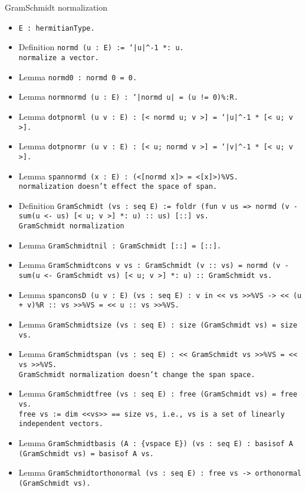 \noindent GramSchmidt normalization
\begin{itemize}
\item \tt{E : hermitianType}.
\item Definition \tt{normd (u : E) := `|u|\^{}-1 *: u.} \\
	normalize a vector.
\item Lemma \tt{normd0 : normd 0 = 0.}
\item Lemma \tt{norm\us normd (u : E) : `|normd u| = (u != 0)\%:R.}
\item Lemma \tt{dotp\us norml (u v : E) :
  [< normd u; v >] = `|u|\^{}-1 * [< u; v >].}
\item Lemma \tt{dotp\us normr (u v : E) :
  [< u; normd v >] = `|v|\^{}-1 * [< u; v >].}
\item Lemma \tt{span\us normd (x : E) : (<[normd x]> = <[x]>)\%VS.} \\
	normalization doesn't effect the space of span.
\item Definition \tt{GramSchmidt (vs : seq E) :=
  foldr (fun v us => normd (v - \bs sum\us (u <- us) [< u; v >] *: u) :: us) [::] vs.} \\
  GramSchmidt normalization
\item Lemma \tt{GramSchmidt\us nil : GramSchmidt [::] = [::].}
\item Lemma \tt{GramSchmidt\us cons v vs : GramSchmidt (v :: vs) =
  normd (v - \bs sum\us (u <- GramSchmidt vs) [< u; v >] *: u) :: GramSchmidt vs.}
\item Lemma \tt{span\us consD (u v : E) (vs : seq E) :
  v \bs in << vs >>\%VS -> << (u + v)\%R :: vs >>\%VS = << u :: vs >>\%VS.}
\item Lemma \tt{GramSchmidt\us size (vs : seq E) : size (GramSchmidt vs) = size vs.}
\item Lemma \tt{GramSchmidt\us span (vs : seq E) : << GramSchmidt vs >>\%VS = << vs >>\%VS.} \\
	GramSchmidt normalization doesn't change the span space.
\item Lemma \tt{GramSchmidt\us free (vs : seq E) : free (GramSchmidt vs) = free vs.} \\
	\tt{free vs := \bs dim <<vs>> == size vs}, i.e., \tt{vs} is a set of linearly independent vectors.
\item Lemma \tt{GramSchmidt\us basis (A : \{vspace E\}) (vs : seq E) :
  basis\us of A (GramSchmidt vs) = basis\us of A vs.}
\item Lemma \tt{GramSchmidt\us orthonormal (vs : seq E) :
  free vs -> orthonormal (GramSchmidt vs).}	\\

\end{itemize}
